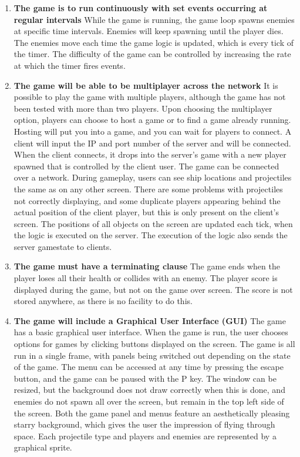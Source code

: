 \begin{enumerate}
\item \textbf{The game is to run continuously with set events occurring at regular intervals}
While the game is running, the game loop spawns enemies at specific time intervals. Enemies will keep spawning until the player dies. The enemies move each time the game logic is updated, which is every tick of the timer. The difficulty of the game can be controlled by increasing the rate at which the timer fires events.
\item \textbf{The game will be able to be multiplayer across the network}
It is possible to play the game with multiple players, although the game has not been tested with more than two players. Upon choosing the multiplayer option, players can choose to host a game or to find a game already running. Hosting will put you into a game, and you can wait for players to connect. A client will input the IP and port number of the server and will be connected. When the client connects, it drops into the server's game with a new player spawned that is controlled by the client user. The game can be connected over a network. During gameplay, users can see ship locations and projectiles the same as on any other screen. There are some problems with projectiles not correctly displaying, and some duplicate players appearing behind the actual position of the client player, but this is only present on the client's screen. The positions of all objects on the screen are updated each tick, when the logic is executed on the server. The execution of the logic also sends the server gamestate to clients.
\item \textbf{The game must have a terminating clause}
The game ends when the player loses all their health or collides with an enemy. The player score is displayed during the game, but not on the game over screen. The score is not stored anywhere, as there is no facility to do this.
\item \textbf{The game will include a Graphical User Interface (GUI)}
The game has a basic graphical user interface. When the game is run, the user chooses options for games by clicking buttons displayed on the screen. The game is all run in a single frame, with panels being switched out depending on the state of the game. The menu can be accessed at any time by pressing the escape button, and the game can be paused with the P key. The window can be resized, but the background does not draw correctly when this is done, and enemies do not spawn all over the screen, but remain in the top left side of the screen. Both the game panel and menus feature an aesthetically pleasing starry background, which gives the user the impression of flying through space. Each projectile type and players and enemies are represented by a graphical sprite.
\end{enumerate}
